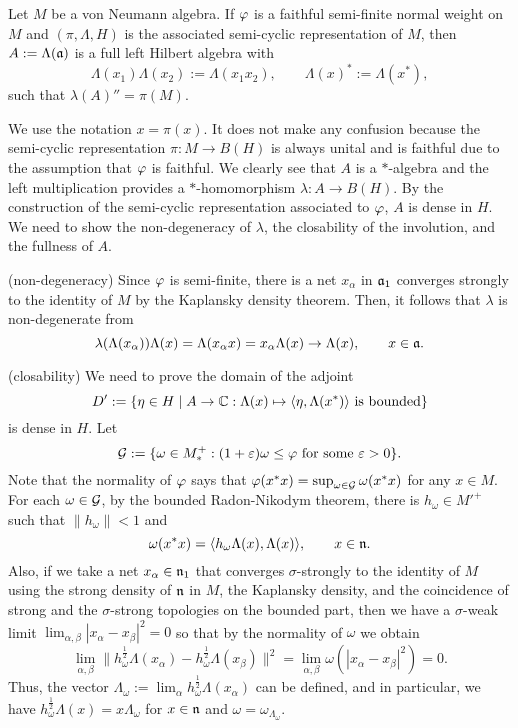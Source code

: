 \documentclass{../../small}
\begin{document}
\begin{thm}
Let $M$ be a von Neumann algebra.
If $\varphi$ is a faithful semi-finite normal weight on $M$ and $(\pi,\Lambda,H)$ is the associated semi-cyclic representation of $M$, then $A:=\Lambda(\mathfrak{a})$ is a full left Hilbert algebra with
\[\Lambda(x_1)\Lambda(x_2):=\Lambda(x_1x_2),\qquad\Lambda(x)^*:=\Lambda(x^*),\]
such that $\lambda(A)''=\pi(M)$.
\end{thm}
\begin{pf}
We use the notation $x=\pi(x)$.
It does not make any confusion because the semi-cyclic representation $\pi:M\to B(H)$ is always unital and is faithful due to the assumption that $\varphi$ is faithful.
We clearly see that $A$ is a $*$-algebra and the left multiplication provides a $*$-homomorphism $\lambda:A\to B(H)$.
By the construction of the semi-cyclic representation associated to $\varphi$, $A$ is dense in $H$.
We need to show the non-degeneracy of $\lambda$, the closability of the involution, and the fullness of $A$.

(non-degeneracy)
Since $\varphi$ is semi-finite, there is a net $x_\alpha$ in $\mathfrak{a}_1$ converges strongly to the identity of $M$ by the Kaplansky density theorem.
Then, it follows that $\lambda$ is non-degenerate from
\[\lambda(\Lambda(x_\alpha))\Lambda(x)=\Lambda(x_\alpha x)=x_\alpha\Lambda(x)\to\Lambda(x),\qquad x\in\mathfrak{a}.\]

(closability)
We need to prove the domain of the adjoint
\[D':=\{\eta\in H\mid A\to\mathbb{C}:\Lambda(x)\mapsto\langle\eta,\Lambda(x^*)\rangle\text{ is bounded}\}\]
is dense in $H$.
Let
\[\mathcal{G}:=\{\omega\in M_*^+:(1+\varepsilon)\omega\le\varphi\text{ for some }\varepsilon>0\}.\]
Note that the normality of $\varphi$ says that $\varphi(x^*x)=\sup_{\omega\in\mathcal{G}}\omega(x^*x)$ for any $x\in M$.
For each $\omega\in\mathcal{G}$, by the bounded Radon-Nikodym theorem, there is $h_\omega\in M'^+$ such that $\|h_\omega\|<1$ and
\[\omega(x^*x)=\langle h_\omega\Lambda(x),\Lambda(x)\rangle,\qquad x\in\mathfrak{n}.\]
Also, if we take a net $x_\alpha\in\mathfrak{n}_1$ that converges $\sigma$-strongly to the identity of $M$ using the strong density of $\mathfrak{n}$ in $M$, the Kaplansky density, and the coincidence of strong and the $\sigma$-strong topologies on the bounded part, then we have a $\sigma$-weak limit $\lim_{\alpha,\beta}|x_\alpha-x_\beta|^2=0$ so that by the normality of $\omega$ we obtain
\[\lim_{\alpha,\beta}\|h_\omega^{\frac12}\Lambda(x_\alpha)-h_\omega^{\frac12}\Lambda(x_\beta)\|^2=\lim_{\alpha,\beta}\omega(|x_\alpha-x_\beta|^2)=0.\]
Thus, the vector $\Lambda_\omega:=\lim_\alpha h_\omega^{\frac12}\Lambda(x_\alpha)$ can be defined, and in particular, we have $h_\omega^{\frac12}\Lambda(x)=x\Lambda_\omega$ for $x\in\mathfrak{n}$ and $\omega=\omega_{\Lambda_\omega}$.


\end{pf}
\end{document}
